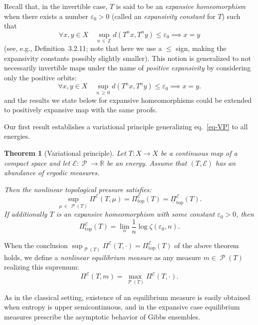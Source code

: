 \documentclass[10pt]{amsart}
\theoremstyle{definition}\newtheorem{defi}[theo]{Definition}\newtheorem{rema}[theo]{Remark}\newtheorem{exam}[theo]{Example}\newtheorem{exem}[theo]{Example}\newtheorem{nota}[theo]{Notation}
\theoremstyle{plain}
\newtheorem{theol}{Theorem}
\theoremstyle{plain}
\newcommand\eps{\varepsilon}
\newcommand\NLP{\Pi}
\renewcommand\top{{\mathrm{top}}}
\newcommand\Prob{{\operatorname{\mathscr{P}}}}
\newcommand*\8{\infty}
\newcommand\RR{\mathbb{R}}
\newcommand\ZZ{\mathbb{Z}}
\newcommand{\En}{\mathcal{E}}
\let\oldforall\forall
\renewcommand*{\forall}{\mathrel{\oldforall}}
\begin{document}
Recall that, in the invertible case, $T$ is said to be an \emph{expansive homeomorphism} when there exists a number $\eps_0>0$ (called an \emph{expansivity constant} for $T$) such that
\[
\forall x,y\in X\quad \sup_{n\,\in\,\ZZ} d\left(T^nx,T^ny\right)\leq\eps_0 \implies x=y
\]
(see, e.g., \cite{Katok-Hasselblatt} Definition~3.2.11; note that here we use a $\le$ sign, making the expansivity constants possibly slightly smaller). This notion is generalized to not necessarily invertible maps under the name of \emph{positive expansivity} by considering only the positive orbits:
\[
\forall x,y\in X\quad \sup_{n\,\ge\,0} d\left(T^nx,T^ny\right)\leq\eps_0 \implies x=y.
\]
and the results we state below for expansive homeomorphisms could be extended to positively expansive map with the same proofs.

Our first result establishes a variational principle generalizing eq.~\eqref{eq-VP} to all energies.

\begin{theol}[Variational principle]\label{thm-var-prin-NL}
Let $T:X\to X$ be a continuous map of a compact space and let $\En:\Prob\to\RR$ be an energy. Assume that $(T,\En)$ has an abundance of ergodic measures.


Then the nonlinear topological pressure satisfies:
\begin{equation}\label{eq-def-Ptop}
\sup_{\mu\,\in\,\Prob(T)} \NLP^\En(T,\mu) = \NLP^\En_\top(T) = \underline{\NLP}_\top^\En(T).
\end{equation}
If additionally $T$ is an expansive homeomorphism with some constant $\eps_0>0$, then
\begin{equation}\label{eq-ent-eps}
\NLP^\En_\top(T) =\lim_n \frac1n \log \zeta(\eps_0,n).
\end{equation}
\end{theol}


When the conclusion $\sup_{\Prob(T)} \NLP^\En(T,\cdot) = \NLP^\En_\top(T)$ of the above theorem holds, we define a \emph{nonlinear equilibrium measure} as any measure $m\in\Prob(T)$ realizing this supremum:
\[
\NLP^\En(T,m)=\max_{\Prob(T)} \NLP^\En(T,\cdot).
\]


As in the classical setting, existence of an equilibrium measure is easily obtained when entropy is upper semicontinuous, and in the expansive case equilibrium measures prescribe the asymptotic behavior of Gibbs ensembles.
\end{document}
